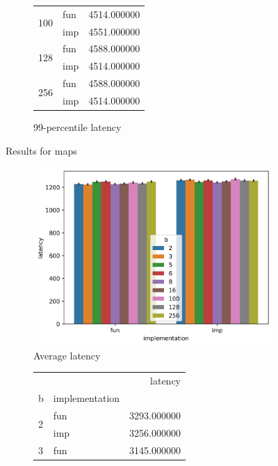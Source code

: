\documentclass{article}
\begin{document}
\begin{figure}[h]
\begin{subfigure}[b]{0.3\textwidth}
\begin{tabular}{llr}
            \multirow[c]{2}{*}{100} & fun & 4514.000000 \\
             & imp & 4551.000000 \\
            \multirow[c]{2}{*}{128} & fun & 4588.000000 \\
             & imp & 4514.000000 \\
            \multirow[c]{2}{*}{256} & fun & 4588.000000 \\
             & imp & 4514.000000 \\
        \end{tabular}
        \caption{99-percentile latency}
    \end{subfigure}
    \caption{Results for maps}
    \label{fig:map}
\end{figure}

\begin{figure}
    \centering
    \begin{subfigure}[b]{0.6\textwidth}
        \centering
        \includegraphics[width=\textwidth]{average-seq.png}
        \caption{Average latency}
    \end{subfigure}
    \begin{subfigure}[b]{0.3\textwidth}
        \centering
        \begin{tabular}{llr}
             &  & latency \\
            b & implementation &  \\
            \multirow[c]{2}{*}{2} & fun & 3293.000000 \\
             & imp & 3256.000000 \\
            \multirow[c]{2}{*}{3} & fun & 3145.000000 \\

\end{tabular}
\end{subfigure}
\end{figure}
\end{document}
